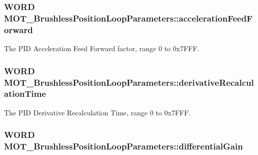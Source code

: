 \subsubsection[{\texorpdfstring{acceleration\+Feed\+Forward}{accelerationFeedForward}}]{\setlength{\rightskip}{0pt plus 5cm}W\+O\+RD M\+O\+T\+\_\+\+Brushless\+Position\+Loop\+Parameters\+::acceleration\+Feed\+Forward}\hypertarget{struct_m_o_t___brushless_position_loop_parameters_ad09f38fe38669005c7ab3710b1921771}{}\label{struct_m_o_t___brushless_position_loop_parameters_ad09f38fe38669005c7ab3710b1921771}


The P\+ID Acceleration Feed Forward factor, range 0 to 0x7\+F\+FF. 

\subsubsection[{\texorpdfstring{derivative\+Recalculation\+Time}{derivativeRecalculationTime}}]{\setlength{\rightskip}{0pt plus 5cm}W\+O\+RD M\+O\+T\+\_\+\+Brushless\+Position\+Loop\+Parameters\+::derivative\+Recalculation\+Time}\hypertarget{struct_m_o_t___brushless_position_loop_parameters_aa2527a45a318f3d34974eae6658833ed}{}\label{struct_m_o_t___brushless_position_loop_parameters_aa2527a45a318f3d34974eae6658833ed}


The P\+ID Derivative Recalculation Time, range 0 to 0x7\+F\+FF. 

\subsubsection[{\texorpdfstring{differential\+Gain}{differentialGain}}]{\setlength{\rightskip}{0pt plus 5cm}W\+O\+RD M\+O\+T\+\_\+\+Brushless\+Position\+Loop\+Parameters\+::differential\+Gain}\hypertarget{struct_m_o_t___brushless_position_loop_parameters_a43d011b77bff1dea322c3094843fc7c5}{}\label{struct_m_o_t___brushless_position_loop_parameters_a43d011b77bff1dea322c3094843fc7c5}


